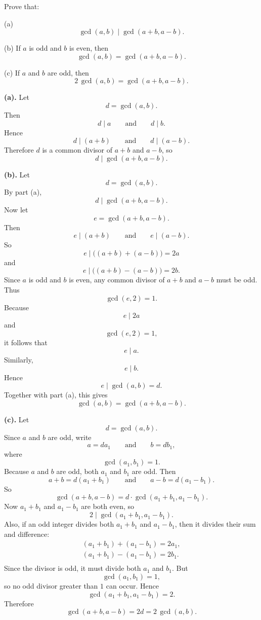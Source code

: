 \begin{problem}{
    Prove that:

    (a)
    \[
        \gcd(a,b)\mid \gcd(a+b,a-b).
    \]

    (b)
    If $a$ is odd and $b$ is even, then
    \[
        \gcd(a,b)=\gcd(a+b,a-b).
    \]

    (c)
    If $a$ and $b$ are odd, then
    \[
        2\,\gcd(a,b)=\gcd(a+b,a-b).
    \]
}
    \textbf{(a).}
    Let
    \[
        d=\gcd(a,b).
    \]
    Then
    \[
        d\mid a
        \qquad\text{and}\qquad
        d\mid b.
    \]
    Hence
    \[
        d\mid (a+b)
        \qquad\text{and}\qquad
        d\mid (a-b).
    \]
    Therefore $d$ is a common divisor of $a+b$ and $a-b$, so
    \[
        d\mid \gcd(a+b,a-b).
    \]

    \textbf{(b).}
    Let
    \[
        d=\gcd(a,b).
    \]
    By part (a),
    \[
        d\mid \gcd(a+b,a-b).
    \]
    Now let
    \[
        e=\gcd(a+b,a-b).
    \]
    Then
    \[
        e\mid (a+b)
        \qquad\text{and}\qquad
        e\mid (a-b).
    \]
    So
    \[
        e\mid \big((a+b)+(a-b)\big)=2a
    \]
    and
    \[
        e\mid \big((a+b)-(a-b)\big)=2b.
    \]
    Since $a$ is odd and $b$ is even, any common divisor of $a+b$ and $a-b$ must be odd.
    Thus
    \[
        \gcd(e,2)=1.
    \]
    Because
    \[
        e\mid 2a
    \]
    and
    \[
        \gcd(e,2)=1,
    \]
    it follows that
    \[
        e\mid a.
    \]
    Similarly,
    \[
        e\mid b.
    \]
    Hence
    \[
        e\mid \gcd(a,b)=d.
    \]
    Together with part (a), this gives
    \[
        \gcd(a,b)=\gcd(a+b,a-b).
    \]

    \textbf{(c).}
    Let
    \[
        d=\gcd(a,b).
    \]
    Since $a$ and $b$ are odd, write
    \[
        a=da_1
        \qquad\text{and}\qquad
        b=db_1,
    \]
    where
    \[
        \gcd(a_1,b_1)=1.
    \]
    Because $a$ and $b$ are odd, both $a_1$ and $b_1$ are odd.
    Then
    \[
        a+b=d(a_1+b_1)
        \qquad\text{and}\qquad
        a-b=d(a_1-b_1).
    \]
    So
    \[
        \gcd(a+b,a-b)=d\cdot \gcd(a_1+b_1,a_1-b_1).
    \]
    Now $a_1+b_1$ and $a_1-b_1$ are both even, so
    \[
        2\mid \gcd(a_1+b_1,a_1-b_1).
    \]
    Also, if an odd integer divides both $a_1+b_1$ and $a_1-b_1$, then it divides their sum and difference:
    \begin{gather*}
        (a_1+b_1)+(a_1-b_1)=2a_1,\\
    (a_1+b_1)-(a_1-b_1)=2b_1.\\
    \end{gather*}
    Since the divisor is odd, it must divide both $a_1$ and $b_1$.
    But
    \[
        \gcd(a_1,b_1)=1,
    \]
    so no odd divisor greater than $1$ can occur.
    Hence
    \[
        \gcd(a_1+b_1,a_1-b_1)=2.
    \]
    Therefore
    \[
        \gcd(a+b,a-b)=2d=2\,\gcd(a,b).
    \]
\end{problem}

